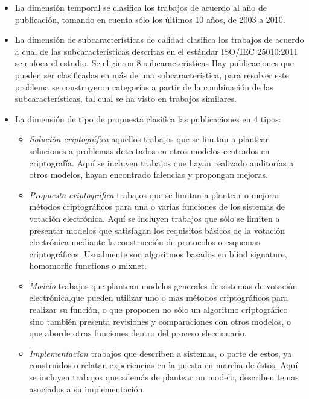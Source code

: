 \begin{itemize}
	\item La dimensión temporal se clasifica los trabajos de acuerdo al año de 
		publicación, tomando en cuenta sólo los últimos 10 años, de 2003 a 2010.
		
	\item La dimensión de subcaracterísticas de calidad clasifica los trabajos de acuerdo 
		a cual de las subcaracterísticas descritas en el estándar ISO/IEC 25010:2011 
		se enfoca el estudio. Se eligieron 8 subcaracterísticas  Hay publicaciones que pueden
		ser clasificadas en más de una subcaracterística, para resolver este problema 
		se construyeron categorías a partir de la combinación de las subcaracterísticas, 
		tal cual se ha visto en trabajos similares. \cite{Afzal}		
			
	\item La dimensión de tipo de propuesta clasifica las publicaciones en 4 tipos:
	\begin{itemize}
		\item  \textit{Solución criptográfica} aquellos trabajos que se limitan a 
			plantear soluciones a problemas detectados en otros 
			modelos centrados en criptografía. Aquí se incluyen trabajos que
			hayan realizado auditorías a otros modelos, hayan encontrado falencias y
			propongan mejoras. 
			
		\item   \textit{Propuesta criptográfica} trabajos que se limitan a plantear 
			o mejorar métodos criptográficos para una o varias funciones 
			de los sistemas de votación electrónica. Aquí se incluyen trabajos que
			sólo se limiten a presentar modelos que satisfagan los requisitos 
			básicos de la votación electrónica mediante
			la construcción de protocolos o esquemas criptográficos. Usualmente 
			son algoritmos basados en blind signature, homomorfic functions o mixnet.
			
		\item  \textit{Modelo} trabajos que plantean modelos generales de sistemas de 
			votación electrónica,que pueden utilizar uno o mas métodos criptográficos
			para realizar su función, o que proponen no sólo un algoritmo criptográfico
			sino también presenta revisiones y comparaciones con otros modelos, o que
			aborde otras funciones dentro del proceso eleccionario.
			
		\item  \textit{Implementacion} trabajos que describen a sistemas, o parte de estos,
			 ya construidos o relatan experiencias en la puesta en marcha de éstos. Aquí
			se incluyen trabajos que además de plantear un modelo, describen temas
			asociados a su implementación.
			
	\end{itemize}
	
\end{itemize}






